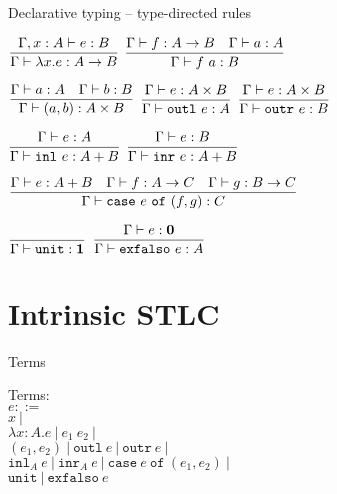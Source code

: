 \documentclass{beamer}
\newcommand{\pipe}{\ |\ }
\newcommand{\Fun}[2]{#1 \to #2}
\newcommand{\Prod}[2]{#1 \times #2}
\newcommand{\Sum}[2]{#1 + #2}
\newcommand{\Unit}{\textbf{1}}
\newcommand{\Empty}{\textbf{0}}
\newcommand{\fun}[2]{\lambda #1. #2}
\newcommand{\app}[2]{#1\ #2}
\newcommand{\pair}[2]{(#1, #2)}
\newcommand{\outl}[1][]{\texttt{outl}\ #1}
\newcommand{\outr}[1][]{\texttt{outr}\ #1}
\newcommand{\inl}[1][]{\texttt{inl}\ #1}
\newcommand{\inr}[1][]{\texttt{inr}\ #1}
\newcommand{\case}[3]{\texttt{case}\ #1\ \texttt{of}\ (#2, #3)}
\newcommand{\unit}{\texttt{unit}}
\newcommand{\exfalso}[1][]{\texttt{exfalso}\ #1}
\newcommand{\fulltyping}[3]{#1 \vdash #2 : #3}
\newcommand{\typing}[2]{\fulltyping{\Gamma}{#1}{#2}}
\newcommand{\infrule}[3][]{\displaystyle \frac{#2}{#3} \textsc{\footnotesize{#1}}}
\newcommand{\extend}[3]{#1, #2 : #3}
\begin{document}
\begin{frame}{Declarative typing -- type-directed rules}

\begin{center}
  $\infrule{\fulltyping{\extend{\Gamma}{x}{A}}{e}{B}}{\typing{\fun{x}{e}}{\Fun{A}{B}}}$ \quad
  $\infrule{\typing{f}{\Fun{A}{B}} \quad \typing{a}{A}}{\typing{\app{f}{a}}{B}}$

  \vspace{2em}

  $\infrule{\typing{a}{A} \quad \typing{b}{B}}{\typing{\pair{a}{b}}{\Prod{A}{B}}}$ \quad
  $\infrule{\typing{e}{\Prod{A}{B}}}{\typing{\outl[e]}{A}}$ \quad
  $\infrule{\typing{e}{\Prod{A}{B}}}{\typing{\outr[e]}{B}}$

  \vspace{2em}

  $\infrule{\typing{e}{A}}{\typing{\inl[e]}{\Sum{A}{B}}}$ \quad
  $\infrule{\typing{e}{B}}{\typing{\inr[e]}{\Sum{A}{B}}}$

  \vspace{2em}

  $\infrule{\typing{e}{\Sum{A}{B}} \quad \typing{f}{\Fun{A}{C}} \quad \typing{g}{\Fun{B}{C}}}{\typing{\case{e}{f}{g}}{C}}$

  \vspace{2em}

  $\infrule{}{\typing{\unit}{\Unit}}$ \quad
  $\infrule{\typing{e}{\Empty}}{\typing{\exfalso[e]}{A}}$
\end{center}

\end{frame}

\section{Intrinsic STLC}

\newcommand{\ifun}[3]{\lambda #1 : #2. #3}
\newcommand{\iinl}[2]{\texttt{inl}_{#1}\ #2}
\newcommand{\iinr}[2]{\texttt{inr}_{#1}\ #2}

\begin{frame}{Terms}

Terms: \\
$e ::=$ \\
\qquad $x \pipe$ \\
\qquad $\ifun{x}{A}{e} \pipe \app{e_1}{e_2} \pipe$ \\
\qquad $\pair{e_1}{e_2} \pipe \outl[e] \pipe \outr[e] \pipe$ \\
\qquad $\iinl{A}{e} \pipe \iinr{A}{e} \pipe \case{e}{e_1}{e_2} \pipe$ \\
\qquad $\unit \pipe \exfalso{e}$

\vspace{2em}

\end{frame}
\end{document}
